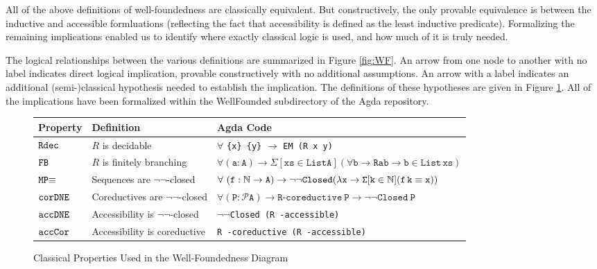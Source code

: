 All of the above definitions of well-foundedness are classically equivalent.
But constructively, the only provable equivalence is between the inductive and accessible 
formluations (reflecting the fact that accessibility is defined as the least inductive predicate).
Formalizing the remaining implications enabled us to identify where exactly classical logic 
is used, and how much of it is truly needed.

The logical relationships between the various definitions are summarized in Figure \ref{fig:WF}.
An arrow from one node to another with no label indicates direct logical implication,
provable constructively with no additional assumptions. An arrow with a label indicates an additional 
(semi-)classical hypothesis needed to establish the implication. 
The definitions of these hypotheses are given in Figure \ref{tab:cprop}.
All of the implications have been 
formalized within the WellFounded subdirectory of the Agda repository.

{
\def\arraystretch{1.3}
\begin{figure}[h!]
\small 
\begin{tabular}{@{}l l l @{}}
\toprule
\textbf{Property} & \textbf{Definition}  &\textbf{Agda Code}  \\
\midrule
$\mathtt{Rdec}$   & $R$ is decidable 
          & $\forall$ \verb|{x} {y}| $\to$ \verb|EM (R x y)|\\
$\mathtt{FB}$     & $R$ is finitely branching 
          & $\mathtt{\forall (a : A) \to \Sigma [ xs \in List A ] (\forall b \to R a b \to b \in{}List\, xs)}$ \\
$\mathtt{MP}{\equiv}$    & Sequences are $\lnot\lnot$-closed
          & $\forall\ \mathtt{(f : \nat \to A) \to \lnot\lnot Closed 
          (\lambda x \to \Sigma [ k \in \nat ] (f\, k \equiv x))}$ \\
$\mathtt{corDNE}$ & Coreductives are $\lnot\lnot$-closed 
          & $\mathtt{\forall (P : \mathcal{P} A) \to R}$-$\mathtt{coreductive\ P \to \lnot\lnot Closed\ P}$\\ 
$\mathtt{accDNE}$ & Accessibility is $\lnot\lnot$-closed
          & $\lnot\lnot$\verb|Closed (R -accessible)| \\
$\mathtt{accCor}$ & Accessibility is coreductive 
          & \verb|R -coreductive (R -accessible)| \\
\bottomrule
\end{tabular}
\centering
\caption{Classical Properties Used in the Well-Foundedness Diagram}
\label{tab:cprop}
\end{figure}
}


